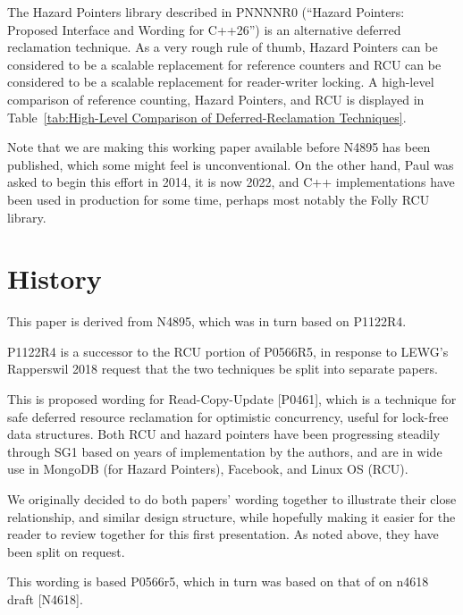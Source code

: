 The Hazard Pointers library described in PNNNNR0 (``Hazard Pointers:
Proposed Interface and Wording for C++26'') is an alternative deferred
reclamation technique.
As a very rough rule of thumb, Hazard Pointers can be considered to be
a scalable replacement for reference counters and RCU can be considered
to be a scalable replacement for reader-writer locking.
A high-level comparison of reference counting, Hazard Pointers, and RCU
is displayed in
Table~\ref{tab:High-Level Comparison of Deferred-Reclamation Techniques}.

Note that we are making this working paper available before N4895 has
been published, which some might feel is unconventional.
On the other hand, Paul was asked to begin this effort in 2014, it is now
2022, and C++ implementations have been used in production for some time,
perhaps most notably the Folly RCU library.

\section{History}
\label{sec:History}

This paper is derived from N4895, which was in turn based on P1122R4.

P1122R4 is a successor to the RCU portion of P0566R5, in response to
LEWG’s Rapperswil 2018 request that the two techniques be split into
separate papers.

This is proposed wording for Read-Copy-Update [P0461], which is
a technique for safe deferred resource reclamation for optimistic
concurrency, useful for lock-free data structures.
Both RCU and hazard pointers have been progressing steadily through SG1
based on years of implementation by the authors, and are in wide use in
MongoDB (for Hazard Pointers), Facebook, and Linux OS (RCU).

We originally decided to do both papers' wording together to illustrate
their close relationship, and similar design structure, while hopefully
making it easier for the reader to review together for this first
presentation.
As noted above, they have been split on request.

This wording is based P0566r5, which in turn was based on that of on
n4618 draft [N4618].
